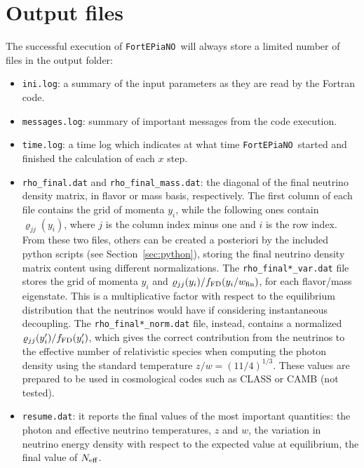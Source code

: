 \documentclass[notitlepage,nofootinbib,showpacs,preprintnumbers,amsmath,amssymb,superscriptaddress,prd,onecolumn]{revtex4-1}
\newcommand{\Neff}{\ensuremath{N_{\rm eff}}}
\newcommand{\fortepiano}{\texttt{FortEPiaNO}}
\begin{document}
\section{Output files}
\label{sec:outputs}
The successful execution of \fortepiano\ will always store
a limited number of files in the output folder:
%
\begin{itemize}
%
\item \texttt{ini.log}: a summary of the input parameters as they are read by the Fortran code.
%
\item \texttt{messages.log}: summary of important messages from the code execution.
%
\item \texttt{time.log}: a time log which indicates at what time \fortepiano\ started
and finished the calculation of each $x$ step.
%
\item \texttt{rho\_final.dat} and \texttt{rho\_final\_mass.dat}:
the diagonal of the final neutrino density matrix,
in flavor or mass basis, respectively.
The first column of each file contains the grid of momenta $y_i$,
while the following ones contain $\varrho_{jj}(y_i)$,
where $j$ is the column index minus one and $i$ is the row index.
From these two files, others can be created a posteriori by the included python scripts
(see Section~\ref{sec:python}),
storing the final neutrino density matrix content
using different normalizations.
The \texttt{rho\_final*\_var.dat} file stores the grid of momenta $y_i$ and
$\varrho_{jj}(y_i)/f_{\rm FD}(y_i/w_{\rm fin})$, for each flavor/mass eigenstate.
This is a multiplicative factor with respect to the equilibrium distribution that the neutrinos
would have if considering instantaneous decoupling.
The \texttt{rho\_final*\_norm.dat} file, instead, contains
a normalized $\varrho_{jj}(y'_i)/f_{\rm FD}(y'_i)$, which gives the correct contribution
from the neutrinos to the effective number of relativistic species
when computing the photon density using the standard temperature $z/w=(11/4)^{1/3}$.
These values are prepared to be used in cosmological codes such as CLASS or CAMB (not tested).
%
\item \texttt{resume.dat}: it reports the final values of the most important quantities:
the photon and effective neutrino temperatures, $z$ and $w$,
the variation in neutrino energy density
with respect to the expected value at equilibrium,
the final value of \Neff.
%
\end{itemize}
\end{document}
